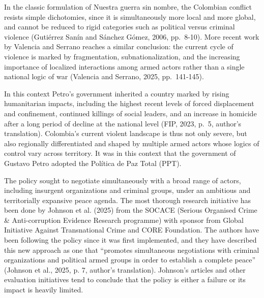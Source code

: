 \documentclass[11pt]{article}
\begin{document}
In the classic formulation of Nuestra guerra sin nombre, the Colombian conflict resists simple dichotomies, since it is simultaneously more local and more global, and cannot be reduced to rigid categories such as political versus criminal violence (Gutiérrez Sanín and Sánchez Gómez, 2006, pp.~8-10). More recent work by Valencia and Serrano reaches a similar conclusion: the current cycle of violence is marked by fragmentation, subnationalization, and the increasing importance of localized interactions among armed actors rather than a single national logic of war (Valencia and Serrano, 2025, pp.~141-145).

In this context Petro's government inherited a country marked by rising humanitarian impacts, including the highest recent levels of forced displacement and confinement, continued killings of social leaders, and an increase in homicide after a long period of decline at the national level (FIP, 2023, p.~5, author's translation). Colombia's current violent landscape is thus not only severe, but also regionally differentiated and shaped by multiple armed actors whose logics of control vary across territory. It was in this context that the government of Gustavo Petro adopted the Política de Paz Total (PPT).  

The policy sought to negotiate simultaneously with a broad range of actors, including insurgent organizations and criminal groups, under an ambitious and territorially expansive peace agenda. The most thorough research initiative has been done by Johnson et al. (2025) from the SOCACE (Serious Organised Crime \& Anti-corruption Evidence Research programme) with sponsor from Global Initiative Against Transnational Crime and CORE Foundation. The authors have been following the policy since it was first implemented, and they have described this new approach as one that “promotes simultaneous negotiations with criminal organizations and political armed groups in order to establish a complete peace'' (Johnson et al., 2025, p. 7, author's translation). Johnson’s articles and other evaluation initiatives tend to conclude that the policy is either a failure or its impact is heavily limited. 
\end{document}
